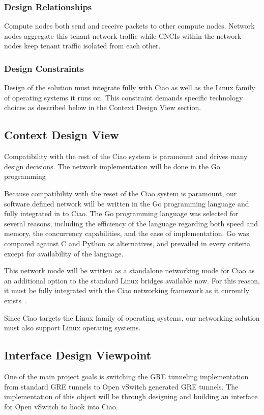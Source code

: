 \documentclass[10pt,onecolumn,journal,draftclsnofoot]{IEEEtran}
\begin{document}
\subsubsection{Design Relationships}

Compute nodes both send and receive packets to other compute nodes. Network
nodes aggregate this tenant network traffic while CNCIs within the network nodes
keep tenant traffic isolated from each other.

\subsubsection{Design Constraints}

Design of the solution must integrate fully with Ciao as well as the Linux
family of operating systems it runs on. This constraint demands specific
technology choices as described below in the Context Design View section.

\subsection{Context Design View}

Compatibility with the rest of the Ciao system is paramount and drives many
design decisions. The network implementation will be done in the Go programming

Because compatibility with the reset of the Ciao system is paramount, our
software defined network will be written in the Go programming language and
fully integrated in to Ciao. The Go programming language was selected for
several reasons, including the efficiency of the language regarding both speed
and memory, the concurrency capabilities, and the ease of implementation. Go was
compared against C and Python as alternatives, and prevailed in every criteria
except for availability of the language.

This network mode will be written as a standalone networking mode for Ciao as an
additional option to the standard Linux bridges available now. For this reason,
it must be fully integrated with the Ciao networking framework as it currently
exists~\cite{ciaoNetworking}.

Since Ciao targets the Linux family of operating systems, our networking
solution must also support Linux operating systems.

\subsection{Interface Design Viewpoint}
One of the main project goals is switching the GRE tunneling implementation 
from standard GRE tunnels to Open vSwitch generated GRE tunnels. The
implementation of this object will be through designing and building an
interface for Open vSwitch to hook into Ciao. 
\end{document}
